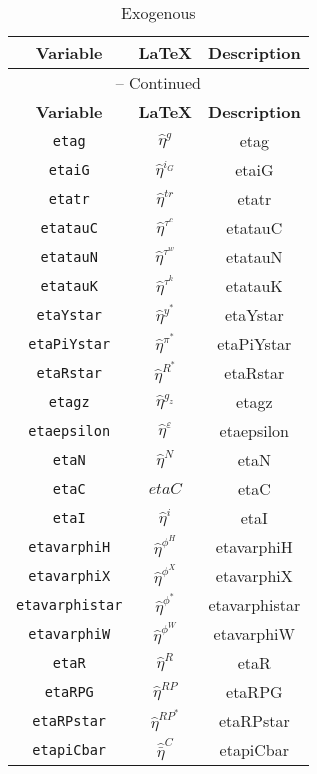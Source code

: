\begin{center}
\begin{longtable}{ccc}
\caption{Exogenous}\\%
\hline%
\multicolumn{1}{c}{\textbf{Variable}} &
\multicolumn{1}{c}{\textbf{\LaTeX}} &
\multicolumn{1}{c}{\textbf{Description}}\\%
\hline\hline%
\endfirsthead
\multicolumn{3}{c}{{\tablename} \thetable{} -- Continued}\\%
\hline%
\multicolumn{1}{c}{\textbf{Variable}} &
\multicolumn{1}{c}{\textbf{\LaTeX}} &
\multicolumn{1}{c}{\textbf{Description}}\\%
\hline\hline%
\endhead
\texttt{etag} & $\hat{\eta}^{g}$ & etag\\
\texttt{etaiG} & $\hat{\eta}^{i_G}$ & etaiG\\
\texttt{etatr} & $\hat{\eta}^{tr}$ & etatr\\
\texttt{etatauC} & $\hat{\eta}^{\tau^c}$ & etatauC\\
\texttt{etatauN} & $\hat{\eta}^{\tau^w}$ & etatauN\\
\texttt{etatauK} & $\hat{\eta}^{\tau^k}$ & etatauK\\
\texttt{etaYstar} & $\hat{\eta}^{y^*}$ & etaYstar\\
\texttt{etaPiYstar} & $\hat{\eta}^{\pi^*}$ & etaPiYstar\\
\texttt{etaRstar} & $\hat{\eta}^{R^*}$ & etaRstar\\
\texttt{etagz} & $\hat{\eta}^{g_z}$ & etagz\\
\texttt{etaepsilon} & $\hat{\eta}^{\varepsilon}$ & etaepsilon\\
\texttt{etaN} & $\hat{\eta}^{N}$ & etaN\\
\texttt{etaC} & $etaC$ & etaC\\
\texttt{etaI} & $\hat{\eta}^{i}$ & etaI\\
\texttt{etavarphiH} & $\hat{\eta}^{\phi^H}$ & etavarphiH\\
\texttt{etavarphiX} & $\hat{\eta}^{\phi^X}$ & etavarphiX\\
\texttt{etavarphistar} & $\hat{\eta}^{\phi^*}$ & etavarphistar\\
\texttt{etavarphiW} & $\hat{\eta}^{\phi^W}$ & etavarphiW\\
\texttt{etaR} & $\hat{\eta}^{R}$ & etaR\\
\texttt{etaRPG} & $\hat{\eta}^{RP}$ & etaRPG\\
\texttt{etaRPstar} & $\hat{\eta}^{RP^*}$ & etaRPstar\\
\texttt{etapiCbar} & $\hat{\bar{\eta}}^C$ & etapiCbar\\

\end{longtable}
\end{center}
